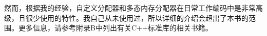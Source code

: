 然而，根据我的经验，自定义分配器和多态内存分配器在日常工作编码中是非常高级，且很少使用的特性。我自己从未使用过，所以详细的介绍会超出了本书的范围。更多信息，请参考附录B中列出有关C++标准库的相关书籍。



















